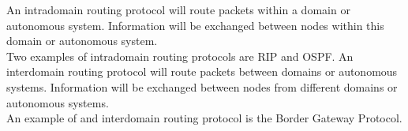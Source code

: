 An intradomain routing protocol will route packets within a domain or autonomous system. Information will be exchanged between nodes within this domain or autonomous system. \\
Two examples of intradomain routing protocols are RIP and OSPF.
An interdomain routing protocol will route packets between domains or autonomous systems. Information will be exchanged between nodes from different domains or autonomous systems. \\
An example of and interdomain routing protocol is the Border Gateway Protocol.